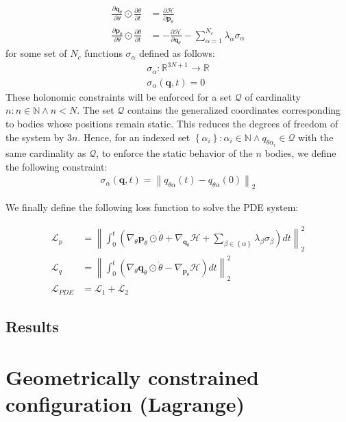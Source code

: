 \documentclass[draft]{agujournal2019}
\newcommand{\norm}[1]{\left\lVert#1\right\rVert}
\begin{document}
\begin{align}
    \frac{\partial \mathbf{q}_\theta}{\partial \theta} \odot \frac{\partial \theta}{\partial t} &= \frac{\partial \mathcal{H}}{\partial \mathbf{p}_\theta} \\
    \frac{\partial \mathbf{p}_\theta}{\partial \theta} \odot \frac{\partial \theta}{\partial t} &= - \frac{\partial \mathcal{H}}{\partial \mathbf{q}_\theta} - \sum_{\alpha = 1}^{N_c} \lambda_\alpha \sigma_\alpha
\end{align}
for some set of $N_c$ functions $\sigma_\alpha$ defined as follows:
\begin{align*}
    \sigma_\alpha \colon \mathbb{R}^{3N + 1} \to \mathbb{R} \\
    \sigma_\alpha \left( \mathbf{q}, t \right) = 0
\end{align*}
These holonomic constraints will be enforced for a set $\mathcal{Q}$ of cardinality $n \colon n \in \mathbb{N} \wedge n < N$. The set $\mathcal{Q}$ contains the generalized coordinates corresponding to bodies whose positions remain static. This reduces the degrees of freedom of the system by $3n$. Hence, for an indexed set $\left\{\alpha_i\right\} \colon \alpha_i \in \mathbb{N} \wedge q_{\theta\alpha_i} \in \mathcal{Q}$ with the same cardinality as $\mathcal{Q}$, to enforce the static behavior of the $n$ bodies, we define the following constraint:
\begin{align*}
    \sigma_\alpha(\mathbf{q}, t) = \norm{q_{\theta\alpha}(t) - q_{\theta\alpha}(0)}_2
\end{align*}

We finally define the following loss function to solve the PDE system:

\begin{align}
    \mathcal{L}_{p} &= \norm{\int_0^t \left(\nabla_\theta \mathbf{p}_\theta \odot \dot{\theta} + \nabla_{\mathbf{q}_\theta} \mathcal{H} + \sum_{\beta \in \left\{\alpha\right\}} \lambda_\beta \sigma_\beta \right) dt}_2^2 \\
    \mathcal{L}_{q} &= \norm{\int_0^t \left(\nabla_\theta \mathbf{q}_\theta \odot \dot{\theta} - \nabla_{\mathbf{p}_\theta} \mathcal{H}\right) dt}^2_2 \\
    \mathcal{L}_{PDE} &= \mathcal{L}_1 + \mathcal{L}_2
\end{align}

\subsection{Results}
\section{Geometrically constrained configuration (Lagrange)}
\end{document}
